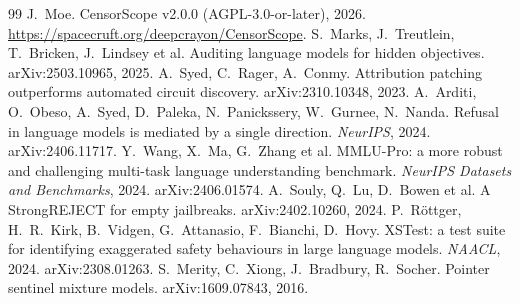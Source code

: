 \documentclass[10pt,a4paper]{article}
\begin{document}
\begin{thebibliography}{99}
 J.~Moe. CensorScope v2.0.0 (AGPL-3.0-or-later), 2026. \url{https://spacecruft.org/deepcrayon/CensorScope}.
 S.~Marks, J.~Treutlein, T.~Bricken, J.~Lindsey et al. Auditing language models for hidden objectives. arXiv:2503.10965, 2025.
 A.~Syed, C.~Rager, A.~Conmy. Attribution patching outperforms automated circuit discovery. arXiv:2310.10348, 2023.
 A.~Arditi, O.~Obeso, A.~Syed, D.~Paleka, N.~Panickssery, W.~Gurnee, N.~Nanda. Refusal in language models is mediated by a single direction. \emph{NeurIPS}, 2024. arXiv:2406.11717.
 Y.~Wang, X.~Ma, G.~Zhang et al. MMLU-Pro: a more robust and challenging multi-task language understanding benchmark. \emph{NeurIPS Datasets and Benchmarks}, 2024. arXiv:2406.01574.
 A.~Souly, Q.~Lu, D.~Bowen et al. A StrongREJECT for empty jailbreaks. arXiv:2402.10260, 2024.
 P.~R\"ottger, H.~R.~Kirk, B.~Vidgen, G.~Attanasio, F.~Bianchi, D.~Hovy. XSTest: a test suite for identifying exaggerated safety behaviours in large language models. \emph{NAACL}, 2024. arXiv:2308.01263.
 S.~Merity, C.~Xiong, J.~Bradbury, R.~Socher. Pointer sentinel mixture models. arXiv:1609.07843, 2016.
\end{thebibliography}
\end{document}
